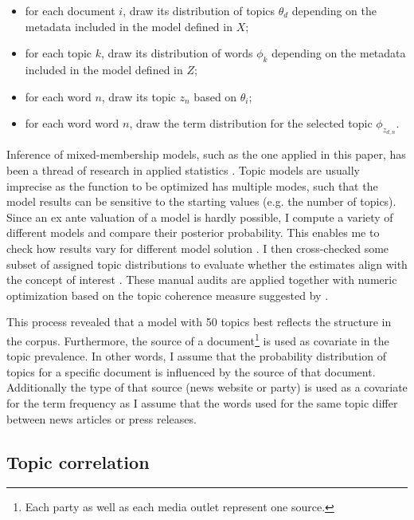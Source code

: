 \documentclass[12pt,a4paper,notitlepage]{article}
\begin{document}
\begin{itemize}
	\item for each document $i$, draw its distribution of topics $\theta_d$ depending on the metadata included in the model defined in $X$; 
	\item for each topic $k$, draw its distribution of words $\phi_k$ depending on the metadata included in the model defined in $Z$;
	\item for each word $n$, draw its topic $z_n$ based on $\theta_i$;
	\item for each word word $n$, draw the term distribution for the selected topic $\phi_{z_{d,n}}$.
\end{itemize}

Inference of mixed-membership models, such as the one applied in this paper, has been a thread of research in applied statistics \citep{blei_latent_2003, erosheva_mixed-membership_2004, braun_variational_2010}. Topic models are usually imprecise as the function to be optimized has multiple modes, such that the model results can be sensitive to the starting values (e.g. the number of topics). Since an ex ante valuation of a model is hardly possible, I compute a variety of different models and compare their posterior probability. This enables me to check how results vary for different model solution \citep{roberts_navigating_2016}. I then cross-checked some subset of assigned topic distributions to evaluate whether the estimates align with the concept of interest \citep{gentzkow_text_2017}. These manual audits are applied together with numeric optimization based on the topic coherence measure suggested by \citet{mimno_optimizing_2011}. 

This process revealed that a model with 50 topics best reflects the structure in the corpus. Furthermore, the source of a document\footnote{Each party as well as each media outlet represent one source.} is used as covariate in the topic prevalence. In other words, I assume that the probability distribution of topics for a specific document is influenced by the source of that document. Additionally the type of that source (news website or party) is used as a covariate for the term frequency as I assume that the words used for the same topic differ between news articles or press releases.  

\subsection{Topic correlation}\label{ch_agendacorrl}
\end{document}
